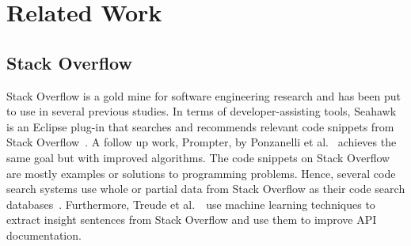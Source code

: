 \documentclass{svjour3}                     %
\begin{document}
%
%
%
%
%
%
%
%

\section{Related Work}

\subsection{Stack Overflow}

Stack Overflow is a gold mine for software engineering research and has been put
to use in several previous studies. In terms of developer-assisting tools,
Seahawk is an Eclipse plug-in that searches and recommends relevant code
snippets from Stack Overflow~\citep{Ponzanelli2013}. A follow up work, Prompter,
by Ponzanelli et al.~\citep{Ponzanelli2014} achieves the same goal but with
improved algorithms. The code snippets on Stack Overflow are mostly examples or
solutions to programming problems. Hence, several code search systems use whole
or partial data from Stack Overflow as their code search
databases~\citep{Keivanloo2014,Park2014,
	Stolee2014,Subramanian2013,Diamantopoulos2015}. Furthermore, Treude et
al.~\cite{Treude2016}~use machine learning techniques to extract insight
sentences from Stack Overflow and use them to improve API documentation.
\end{document}
